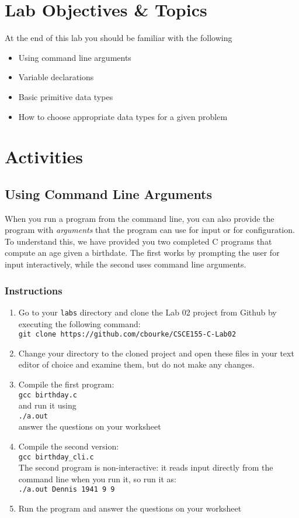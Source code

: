 \documentclass[12pt]{scrartcl}
\begin{document}
\section{Lab Objectives \& Topics}
At the end of this lab you should be familiar with the following
\begin{itemize}
  \item Using command line arguments
  \item Variable declarations
  \item Basic primitive data types
  \item How to choose appropriate data types for a given problem
\end{itemize}

\section{Activities}

\subsection{Using Command Line Arguments}

When you run a program from the command line, you can also provide
the program with \emph{arguments} that the program can use for input
or for configuration.  To understand this, we have provided you two
completed C programs that compute an age given a birthdate.  The
first works by prompting the user for input interactively, while the second
uses command line arguments.

\subsubsection*{Instructions}

\begin{enumerate}
  \item Go to your \texttt{labs} directory and clone the Lab 02 project
  	from Github by executing the following command:\\
	\texttt{git clone https://github.com/cbourke/CSCE155-C-Lab02}
  \item Change your directory to the cloned project and open these files in
  	your text editor of choice and examine them, but do not make any changes.
  \item Compile the first program: \\
  \texttt{gcc birthday.c} \\
  and run it using \\
  \texttt{./a.out} \\
  answer the questions on your worksheet
  \item Compile the second version: \\
  \texttt{gcc birthday_cli.c} \\
  The second program is non-interactive: it reads input directly from the
  command line when you run it, so run it as:\\
	\texttt{./a.out Dennis 1941 9 9}
  \item Run the program and answer the questions on your worksheet
\end{enumerate}
\end{document}

